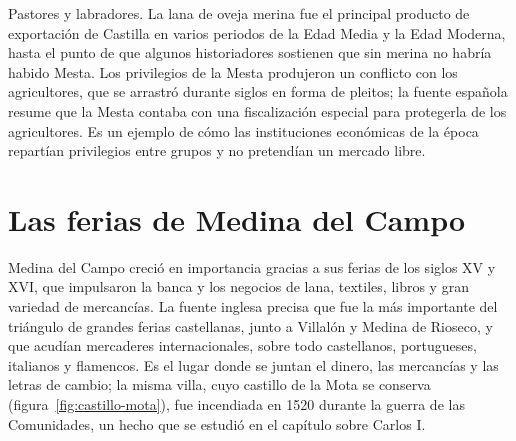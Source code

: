 \documentclass{book}
\begin{document}

Pastores y labradores. La lana de oveja merina fue el principal producto de exportación de Castilla en varios periodos de la Edad Media y la Edad Moderna, hasta el punto de que algunos historiadores sostienen que sin merina no habría habido Mesta. Los privilegios de la Mesta produjeron un conflicto con los agricultores, que se arrastró durante siglos en forma de pleitos; la fuente española resume que la Mesta contaba con una fiscalización especial para protegerla de los agricultores. Es un ejemplo de cómo las instituciones económicas de la época repartían privilegios entre grupos y no pretendían un mercado libre.


\section{Las ferias de Medina del Campo}

Medina del Campo creció en importancia gracias a sus ferias de los siglos XV y XVI, que impulsaron la banca y los negocios de lana, textiles, libros y gran variedad de mercancías. La fuente inglesa precisa que fue la más importante del triángulo de grandes ferias castellanas, junto a Villalón y Medina de Rioseco, y que acudían mercaderes internacionales, sobre todo castellanos, portugueses, italianos y flamencos. Es el lugar donde se juntan el dinero, las mercancías y las letras de cambio; la misma villa, cuyo castillo de la Mota se conserva (figura~\ref{fig:castillo-mota}), fue incendiada en 1520 durante la guerra de las Comunidades, un hecho que se estudió en el capítulo sobre Carlos I.

\end{document}
